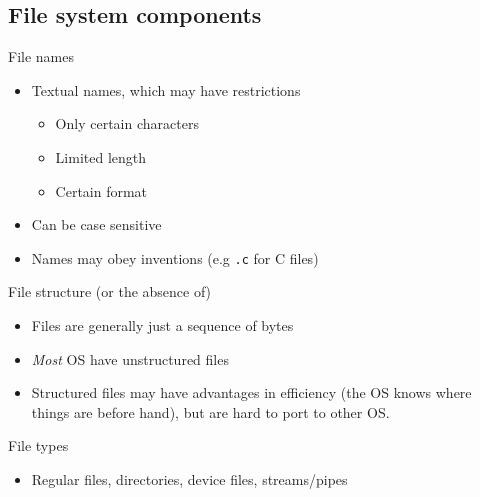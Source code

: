 \documentclass[journal, letterpaper]{IEEEtran}
\begin{document}
\subsection{File system components}
\begin{example}{File names}
    \begin{itemize}
        \item Textual names, which may have restrictions
        \begin{itemize}
            \item Only certain characters
            \item Limited length
            \item Certain format
        \end{itemize}
        \item Can be case sensitive
        \item Names may obey inventions (e.g \verb|.c| for C files)
    \end{itemize}
\end{example}
\begin{example}{File structure (or the absence of)}
    \begin{itemize}
        \item Files are generally just a sequence of bytes
        \item \textit{Most} OS have unstructured files
        \item Structured files may have advantages in efficiency (the OS knows where things are before hand), but are hard to port to other OS.
    \end{itemize}
\end{example}
\begin{example}{File types}
    \begin{itemize}
        \item Regular files, directories, device files, streams/pipes
    \end{itemize}
\end{example}
\end{document}
